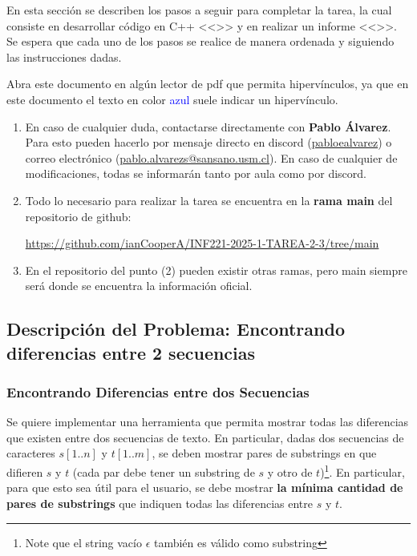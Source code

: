 En esta sección se describen los pasos a seguir para completar la tarea, la cual consiste en desarrollar código en C++ <<>> y en realizar un informe <<>>. Se espera que cada uno de los pasos se realice de manera ordenada y siguiendo las instrucciones dadas.

\begin{mdframed}
    Abra este documento en algún lector de pdf que permita hipervínculos, ya que en este documento el texto en color \textcolor{blue}{azul} suele indicar un hipervínculo.
\end{mdframed}

\begin{enumerate}[(1)]
    \item 
    En caso de cualquier duda, contactarse directamente con \textbf{Pablo Álvarez}. Para esto pueden hacerlo por mensaje directo en discord (\url{pabloealvarez}) o correo electrónico (\url{pablo.alvarezs@sansano.usm.cl}). En caso de cualquier de modificaciones, todas se informarán tanto por aula como por discord.
    \item Todo lo necesario para realizar la tarea se encuentra en la \textbf{rama main} del repositorio de github:
\begin{center}

    \url{https://github.com/ianCooperA/INF221-2025-1-TAREA-2-3/tree/main}
        
\end{center}
\item En el repositorio del punto (2) pueden existir otras ramas, pero main siempre será donde se encuentra la información oficial.
\end{enumerate}

\subsection{Descripción del Problema: Encontrando diferencias entre 2 secuencias}
\subsubsection{Encontrando Diferencias entre dos Secuencias}

Se quiere implementar una herramienta que permita mostrar todas las diferencias que existen entre dos secuencias de texto. En particular, dadas dos secuencias de caracteres $s[1{..}n]$ y $t[1{..}m]$, se deben mostrar pares de substrings en que difieren $s$ y $t$ (cada par debe tener un substring de $s$  y otro de $t$)\footnote{Note que el string vacío $\epsilon$ también es válido como substring}. En particular, para que esto sea útil para el usuario, se debe mostrar \textbf{la mínima cantidad de pares de substrings} que indiquen todas las diferencias entre $s$ y $t$. 

